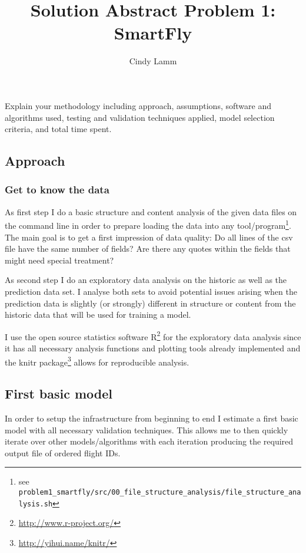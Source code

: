 \documentclass[12pt,a4paper]{article}
\author{Cindy Lamm}
\title{Solution Abstract Problem 1: SmartFly}
\begin{document}
\VerbatimFootnotes
\maketitle

Explain your methodology including approach, assumptions, software and algorithms used, testing and validation techniques applied, model selection criteria, and total time spent.

\subsection{Approach} %
\label{sub:approach}

\subsubsection{Get to know the data} %
\label{subsub:get2know_data}

As first step I do a basic structure and content analysis of the given data files on the command line in order to prepare loading the data into any tool/program\footnote{see \verb+problem1_smartfly/src/00_file_structure_analysis/file_structure_analysis.sh+ }. The main goal is to get a first impression of data quality: Do all lines of the csv file have the same number of fields? Are there any quotes within the fields that might need special treatment?

As second step I do an exploratory data analysis on the historic as well as the prediction data set. I analyse both sets to avoid potential issues arising when the prediction data is slightly (or strongly) different in structure or content from the historic data that will be used for training a model. 

I use the open source statistics software R\footnote{\url{http://www.r-project.org/}} for the exploratory data analysis since it has all necessary analysis functions and plotting tools already implemented and the knitr package\footnote{\url{http://yihui.name/knitr/}} allows for reproducible analysis.


\subsection{First basic model} %
\label{sub:first_basic_model}

In order to setup the infrastructure from beginning to end I estimate a first basic model with all necessary validation techniques. This allows me to then quickly iterate over other models/algorithms with each iteration producing the required output file of ordered flight IDs.
\end{document}
